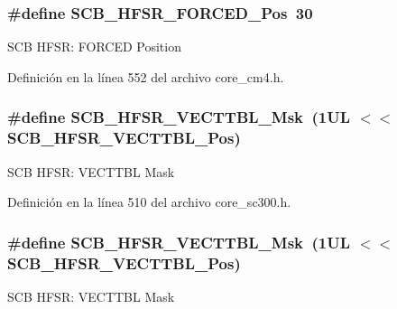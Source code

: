 \subsubsection[{\texorpdfstring{S\+C\+B\+\_\+\+H\+F\+S\+R\+\_\+\+F\+O\+R\+C\+E\+D\+\_\+\+Pos}{SCB_HFSR_FORCED_Pos}}]{\setlength{\rightskip}{0pt plus 5cm}\#define S\+C\+B\+\_\+\+H\+F\+S\+R\+\_\+\+F\+O\+R\+C\+E\+D\+\_\+\+Pos~30}\hypertarget{group___c_m_s_i_s___s_c_b_gab361e54183a378474cb419ae2a55d6f4}{}\label{group___c_m_s_i_s___s_c_b_gab361e54183a378474cb419ae2a55d6f4}
S\+CB H\+F\+SR\+: F\+O\+R\+C\+ED Position 

Definición en la línea 552 del archivo core\+\_\+cm4.\+h.

\subsubsection[{\texorpdfstring{S\+C\+B\+\_\+\+H\+F\+S\+R\+\_\+\+V\+E\+C\+T\+T\+B\+L\+\_\+\+Msk}{SCB_HFSR_VECTTBL_Msk}}]{\setlength{\rightskip}{0pt plus 5cm}\#define S\+C\+B\+\_\+\+H\+F\+S\+R\+\_\+\+V\+E\+C\+T\+T\+B\+L\+\_\+\+Msk~(1\+U\+L $<$$<$ S\+C\+B\+\_\+\+H\+F\+S\+R\+\_\+\+V\+E\+C\+T\+T\+B\+L\+\_\+\+Pos)}\hypertarget{group___c_m_s_i_s___s_c_b_gaac5e289211d0a63fe879a9691cb9e1a9}{}\label{group___c_m_s_i_s___s_c_b_gaac5e289211d0a63fe879a9691cb9e1a9}
S\+CB H\+F\+SR\+: V\+E\+C\+T\+T\+BL Mask 

Definición en la línea 510 del archivo core\+\_\+sc300.\+h.

\subsubsection[{\texorpdfstring{S\+C\+B\+\_\+\+H\+F\+S\+R\+\_\+\+V\+E\+C\+T\+T\+B\+L\+\_\+\+Msk}{SCB_HFSR_VECTTBL_Msk}}]{\setlength{\rightskip}{0pt plus 5cm}\#define S\+C\+B\+\_\+\+H\+F\+S\+R\+\_\+\+V\+E\+C\+T\+T\+B\+L\+\_\+\+Msk~(1\+U\+L $<$$<$ S\+C\+B\+\_\+\+H\+F\+S\+R\+\_\+\+V\+E\+C\+T\+T\+B\+L\+\_\+\+Pos)}\hypertarget{group___c_m_s_i_s___s_c_b_gaac5e289211d0a63fe879a9691cb9e1a9}{}\label{group___c_m_s_i_s___s_c_b_gaac5e289211d0a63fe879a9691cb9e1a9}
S\+CB H\+F\+SR\+: V\+E\+C\+T\+T\+BL Mask 

